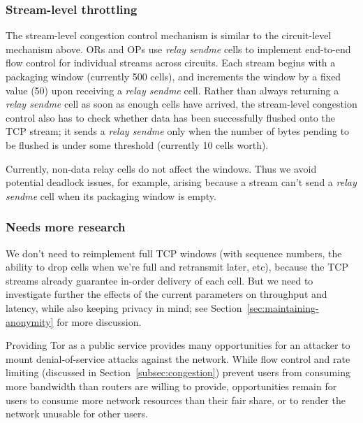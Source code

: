 \documentclass[times,10pt,twocolumn]{article}
\begin{document}
\subsubsection{Stream-level throttling}

The stream-level congestion control mechanism is similar to the
circuit-level mechanism above. ORs and OPs use \emph{relay sendme} cells
to implement end-to-end flow control for individual streams across
circuits. Each stream begins with a packaging window (currently 500 cells),
and increments the window by a fixed value (50) upon receiving a \emph{relay
sendme} cell. Rather than always returning a \emph{relay sendme} cell as soon
as enough cells have arrived, the stream-level congestion control also
has to check whether data has been successfully flushed onto the TCP
stream; it sends a \emph{relay sendme} only when the number of bytes pending
to be flushed is under some threshold (currently 10 cells worth).

Currently, non-data relay cells do not affect the windows. Thus we
avoid potential deadlock issues, for example, arising because a stream
can't send a \emph{relay sendme} cell when its packaging window is empty.

\subsubsection{Needs more research}

We don't need to reimplement full TCP windows (with sequence numbers,
the ability to drop cells when we're full and retransmit later, etc),
because the TCP streams already guarantee in-order delivery of each
cell. But we need to investigate further the effects of the current
parameters on throughput and latency, while also keeping privacy in mind;
see Section~\ref{sec:maintaining-anonymity} for more discussion.


\label{subsec:dos}

Providing Tor as a public service provides many opportunities for an
attacker to mount denial-of-service attacks against the network.  While
flow control and rate limiting (discussed in
Section~\ref{subsec:congestion}) prevent users from consuming more
bandwidth than routers are willing to provide, opportunities remain for
users to
consume more network resources than their fair share, or to render the
network unusable for other users.
\end{document}
